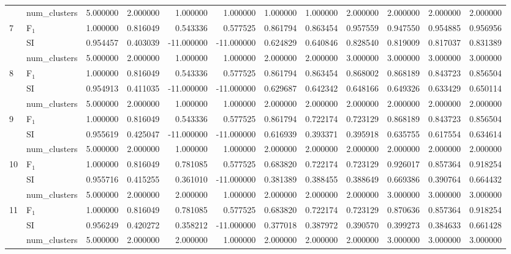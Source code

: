 \begin{tabular}{llrrrrrrrrrr}
 & num_clusters & 5.000000 & 2.000000 & 1.000000 & 1.000000 & 1.000000 & 1.000000 & 2.000000 & 2.000000 & 2.000000 & 2.000000 \\
\multirow[c]{3}{*}{7} & F$_1$ & 1.000000 & 0.816049 & 0.543336 & 0.577525 & 0.861794 & 0.863454 & 0.957559 & 0.947550 & 0.954885 & 0.956956 \\
 & SI & 0.954457 & 0.403039 & -11.000000 & -11.000000 & 0.624829 & 0.640846 & 0.828540 & 0.819009 & 0.817037 & 0.831389 \\
 & num_clusters & 5.000000 & 2.000000 & 1.000000 & 1.000000 & 2.000000 & 2.000000 & 3.000000 & 3.000000 & 3.000000 & 3.000000 \\
\multirow[c]{3}{*}{8} & F$_1$ & 1.000000 & 0.816049 & 0.543336 & 0.577525 & 0.861794 & 0.863454 & 0.868002 & 0.868189 & 0.843723 & 0.856504 \\
 & SI & 0.954913 & 0.411035 & -11.000000 & -11.000000 & 0.629687 & 0.642342 & 0.648166 & 0.649326 & 0.633429 & 0.650114 \\
 & num_clusters & 5.000000 & 2.000000 & 1.000000 & 1.000000 & 2.000000 & 2.000000 & 2.000000 & 2.000000 & 2.000000 & 2.000000 \\
\multirow[c]{3}{*}{9} & F$_1$ & 1.000000 & 0.816049 & 0.543336 & 0.577525 & 0.861794 & 0.722174 & 0.723129 & 0.868189 & 0.843723 & 0.856504 \\
 & SI & 0.955619 & 0.425047 & -11.000000 & -11.000000 & 0.616939 & 0.393371 & 0.395918 & 0.635755 & 0.617554 & 0.634614 \\
 & num_clusters & 5.000000 & 2.000000 & 1.000000 & 1.000000 & 2.000000 & 2.000000 & 2.000000 & 2.000000 & 2.000000 & 2.000000 \\
\multirow[c]{3}{*}{10} & F$_1$ & 1.000000 & 0.816049 & 0.781085 & 0.577525 & 0.683820 & 0.722174 & 0.723129 & 0.926017 & 0.857364 & 0.918254 \\
 & SI & 0.955716 & 0.415255 & 0.361010 & -11.000000 & 0.381389 & 0.388455 & 0.388649 & 0.669386 & 0.390764 & 0.664432 \\
 & num_clusters & 5.000000 & 2.000000 & 2.000000 & 1.000000 & 2.000000 & 2.000000 & 2.000000 & 3.000000 & 3.000000 & 3.000000 \\
\multirow[c]{3}{*}{11} & F$_1$ & 1.000000 & 0.816049 & 0.781085 & 0.577525 & 0.683820 & 0.722174 & 0.723129 & 0.870636 & 0.857364 & 0.918254 \\
 & SI & 0.956249 & 0.420272 & 0.358212 & -11.000000 & 0.377018 & 0.387972 & 0.390570 & 0.399273 & 0.384633 & 0.661428 \\
 & num_clusters & 5.000000 & 2.000000 & 2.000000 & 1.000000 & 2.000000 & 2.000000 & 2.000000 & 3.000000 & 3.000000 & 3.000000 \\
\bottomrule
\end{tabular}
